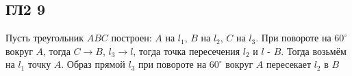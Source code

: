 		\subsection{ГЛ2 9}		
		Пусть треугольник $ABC$ построен: $A$ на $l_{1}$, $B$ на $l_{2}$, $C$ на $l_{3}$. При повороте на $60^{\circ}$ вокруг $A$, тогда $C \to B$, $l_{3} \to l$, тогда точка пересечения $l_2$ и $l$ - $B$.
		Тогда возьмём на $l_{1}$ точку $A$. Образ прямой $l_{3}$ при повороте на $60^{\circ}$ вокруг $A$ пересекает $l_{2}$ в $B$
		\begin{figure}[h]
		\end{figure}